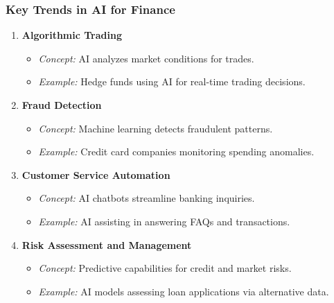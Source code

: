 \documentclass[aspectratio=169]{beamer}
\begin{document}
\begin{frame}[fragile]
    \frametitle{Key Trends in AI for Finance}
    \begin{enumerate}
        \item \textbf{Algorithmic Trading}
            \begin{itemize}
                \item \textit{Concept:} AI analyzes market conditions for trades.
                \item \textit{Example:} Hedge funds using AI for real-time trading decisions.
            \end{itemize}
        \item \textbf{Fraud Detection}
            \begin{itemize}
                \item \textit{Concept:} Machine learning detects fraudulent patterns.
                \item \textit{Example:} Credit card companies monitoring spending anomalies.
            \end{itemize}
        \item \textbf{Customer Service Automation}
            \begin{itemize}
                \item \textit{Concept:} AI chatbots streamline banking inquiries.
                \item \textit{Example:} AI assisting in answering FAQs and transactions.
            \end{itemize}
        \item \textbf{Risk Assessment and Management}
            \begin{itemize}
                \item \textit{Concept:} Predictive capabilities for credit and market risks.
                \item \textit{Example:} AI models assessing loan applications via alternative data.
            \end{itemize}
    \end{enumerate}
\end{frame}
\end{document}
